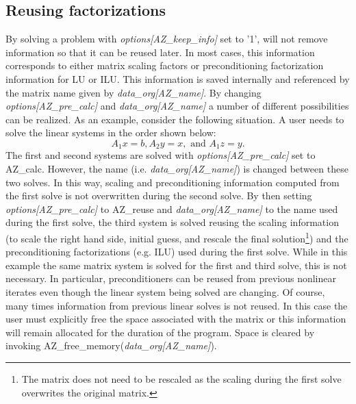 \subsection{Reusing factorizations}\label{reusing}
By solving a problem with {\it options[{\sf AZ\_keep\_info}]} set to '1', 
\Az{} will not remove information so that it can be reused
later. In most cases, this information corresponds to either matrix scaling
factors or preconditioning factorization information for LU or ILU.  This
information is saved internally and referenced by the matrix name given by {\it
  data\_org[{\sf AZ\_name]}}. By changing {\it options[{\sf AZ\_pre\_calc}]}
and {\it data\_org[{\sf AZ\_name}]} a number of different \Az{} possibilities
can be realized. As an example, consider the following situation. A user needs
to solve the linear systems in the order shown below:
\[
A_1 x = b , A_2 y = x , \mbox{ and } A_1 z = y.
\]
The first and second systems are solved with {\it options[{\sf AZ\_pre\_calc}]}
set to {\sf AZ\_calc}. However, the name (i.e. {\it data\_org[{\sf AZ\_name}]})
is changed between these two solves. In this way, scaling and preconditioning
information computed from the first solve is not overwritten during the second
solve.  By then setting {\it options[{\sf AZ\_pre\_calc}]} to {\sf AZ\_reuse}
and {\it data\_org[{\sf AZ\_name}]} to the name used during the first solve,
the third system is solved reusing the scaling information (to scale the right
hand side, initial guess, and rescale the final solution\footnote{The matrix
  does not need to be rescaled as the scaling during the first solve overwrites
  the original matrix.}) and the preconditioning factorizations (e.g. ILU) used
during the first solve. While in this example the same matrix system is solved
for the first and third solve, this is not necessary. In particular,
preconditioners can be reused from previous nonlinear iterates even though the
linear system being solved are changing. Of course, many times information from
previous linear solves is not reused. In this case the user must explicitly
free the space associated with the matrix or this information will remain
allocated for the duration of the program. Space is cleared by invoking {\sf
  AZ\_free\_memory({\it data\_org[{\sf AZ\_name}]})}.

